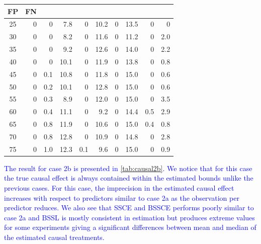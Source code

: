 \documentclass[preprint,12pt]{elsarticle}
\newcommand{\added}[1]{\textcolor{blue}{#1}}
\begin{document}
\begin{table}[h]
\begin{tabular}{c|rrr|rr|rr|rr}
		\multicolumn{1}{c}{FP}&
		\multicolumn{1}{c}{FN}
		\\
		\hline
		25 & 0 & 0 & 7.8 & 0 & 10.2 & 0 & 13.5 & 0 & 0 \\ 
		30 & 0 & 0 & 8.2 & 0 & 11.6 & 0 & 11.2 & 0 & 2.0 \\ 
		35 & 0 & 0 & 9.2 & 0 & 12.6 & 0 & 14.0 & 0 & 2.2 \\ 
		40 & 0 & 0 & 10.1 & 0 & 11.9 & 0 & 13.8 & 0 & 0.8 \\ 
		45 & 0 & 0.1 & 10.8 & 0 & 11.8 & 0 & 15.0 & 0 & 0.6 \\ 
		50 & 0 & 0.2 & 10.1 & 0 & 12.8 & 0 & 15.0 & 0 & 0.6 \\ 
		55 & 0 & 0.3 & 8.9 & 0 & 12.0 & 0 & 15.0 & 0 & 3.5 \\ 
		60 & 0 & 0.4 & 11.1 & 0 & 9.2 & 0 & 14.4 & 0.5 & 2.9 \\ 
		65 & 0 & 0.8 & 11.9 & 0 & 10.6 & 0 & 15.0 & 0.4 & 0.8 \\ 
		70 & 0 & 0.8 & 12.8 & 0 & 10.9 & 0 & 14.8 & 0 & 2.8 \\ 
		75 & 0 & 1.0 & 12.3 & 0.1 & 9.6 & 0 & 15.0 & 0 & 0.9 \\ 
		\hline
	\end{tabular}
\end{table}

\added{The result for case 2b is presented in \cref{tab:causal2b}. We notice that for this case the true causal effect is always contained within the estimated bounds unlike the previous cases. For this case, the imprecision in the estimated causal effect increases with respect to predictors similar to case 2a as the observation per predictor reduces. We also see that SSCE and BSSCE performs poorly similar to case 2a and BSSL is mostly consistent in estimation but produces extreme values for some experiments giving a significant differences between mean and median of the estimated causal treatments.}
\end{document}
